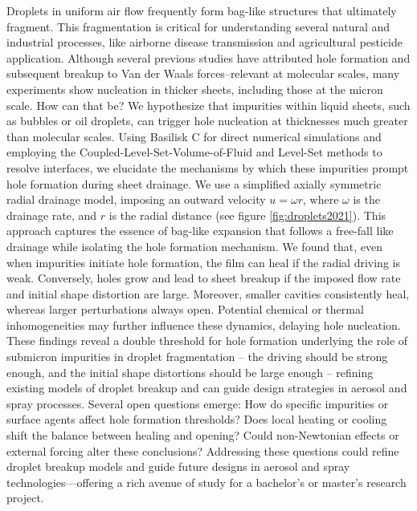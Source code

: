 \documentclass[11pt]{article}
\begin{document}
Droplets in uniform air flow frequently form bag-like structures that ultimately fragment. This fragmentation is critical for understanding several natural and industrial processes, like airborne disease transmission and agricultural pesticide application. 
Although several previous studies have attributed hole formation and subsequent breakup to Van der Waals forces--relevant at molecular scales, many experiments show nucleation in thicker sheets, including those at the micron scale. How can that be? We hypothesize that impurities within liquid sheets, such as bubbles or oil droplets, can trigger hole nucleation at thicknesses much greater than molecular scales. 
Using Basilisk C for direct numerical simulations and employing the Coupled-Level-Set-Volume-of-Fluid and Level-Set methods to resolve interfaces, we elucidate the mechanisms by which these impurities prompt hole formation during sheet drainage. 
We use a simplified axially symmetric radial drainage model, imposing an outward velocity $u = \omega r$, where $\omega$ is the drainage rate, and $r$ is the radial distance (see figure \ref{fig:droplets2021}). This approach captures the essence of bag-like expansion that follows a free-fall like drainage while isolating the hole formation mechanism.
We found that, even when impurities initiate hole formation, the film can heal if the radial driving is weak. Conversely, holes grow and lead to sheet breakup if the imposed flow rate and initial shape distortion are large.
Moreover, smaller cavities consistently heal, whereas larger perturbations always open. Potential chemical or thermal inhomogeneities may further influence these dynamics, delaying hole nucleation. These findings reveal a double threshold for hole formation underlying the role of submicron impurities in droplet fragmentation -- the driving should be strong enough, and the initial shape distortions should be large enough -- refining existing models of droplet breakup and can guide design strategies in aerosol and spray processes.
Several open questions emerge: How do specific impurities or surface agents affect hole formation thresholds? Does local heating or cooling shift the balance between healing and opening? Could non-Newtonian effects or external forcing alter these conclusions? Addressing these questions could refine droplet breakup models and guide future designs in aerosol and spray technologies—offering a rich avenue of study for a bachelor's or master's research project.
\end{document}
